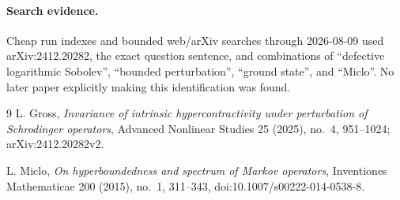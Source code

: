 \documentclass[11pt]{article}
\begin{document}
\paragraph{Search evidence.}
Cheap run indexes and bounded web/arXiv searches through 2026-08-09 used
arXiv:2412.20282, the exact question sentence, and combinations of
``defective logarithmic Sobolev'', ``bounded perturbation'', ``ground state'',
and ``Miclo''.  No later paper explicitly making this identification was
found.

\begin{thebibliography}{9}
L. Gross,
\emph{Invariance of intrinsic hypercontractivity under perturbation of
Schrodinger operators},
Advanced Nonlinear Studies 25 (2025), no.~4, 951--1024;
arXiv:2412.20282v2.

L. Miclo,
\emph{On hyperboundedness and spectrum of Markov operators},
Inventiones Mathematicae 200 (2015), no.~1, 311--343,
doi:10.1007/s00222-014-0538-8.
\end{thebibliography}
\end{document}
